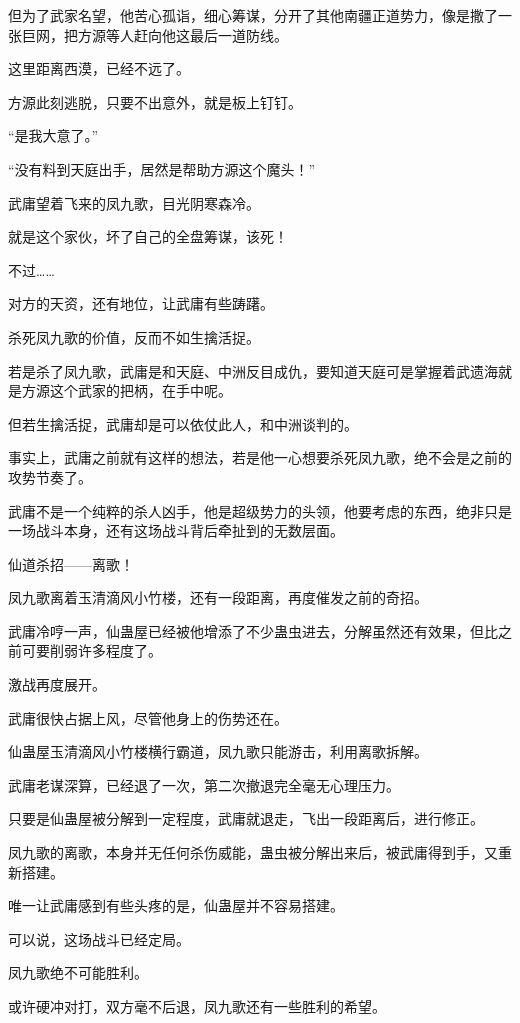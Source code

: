 \begin{this_body}
但为了武家名望，他苦心孤诣，细心筹谋，分开了其他南疆正道势力，像是撒了一张巨网，把方源等人赶向他这最后一道防线。

这里距离西漠，已经不远了。

方源此刻逃脱，只要不出意外，就是板上钉钉。

“是我大意了。”

“没有料到天庭出手，居然是帮助方源这个魔头！”

武庸望着飞来的凤九歌，目光阴寒森冷。

就是这个家伙，坏了自己的全盘筹谋，该死！

不过……

对方的天资，还有地位，让武庸有些踌躇。

杀死凤九歌的价值，反而不如生擒活捉。

若是杀了凤九歌，武庸是和天庭、中洲反目成仇，要知道天庭可是掌握着武遗海就是方源这个武家的把柄，在手中呢。

但若生擒活捉，武庸却是可以依仗此人，和中洲谈判的。

事实上，武庸之前就有这样的想法，若是他一心想要杀死凤九歌，绝不会是之前的攻势节奏了。

武庸不是一个纯粹的杀人凶手，他是超级势力的头领，他要考虑的东西，绝非只是一场战斗本身，还有这场战斗背后牵扯到的无数层面。

仙道杀招——离歌！

凤九歌离着玉清滴风小竹楼，还有一段距离，再度催发之前的奇招。

武庸冷哼一声，仙蛊屋已经被他增添了不少蛊虫进去，分解虽然还有效果，但比之前可要削弱许多程度了。

激战再度展开。

武庸很快占据上风，尽管他身上的伤势还在。

仙蛊屋玉清滴风小竹楼横行霸道，凤九歌只能游击，利用离歌拆解。

武庸老谋深算，已经退了一次，第二次撤退完全毫无心理压力。

只要是仙蛊屋被分解到一定程度，武庸就退走，飞出一段距离后，进行修正。

凤九歌的离歌，本身并无任何杀伤威能，蛊虫被分解出来后，被武庸得到手，又重新搭建。

唯一让武庸感到有些头疼的是，仙蛊屋并不容易搭建。

可以说，这场战斗已经定局。

凤九歌绝不可能胜利。

或许硬冲对打，双方毫不后退，凤九歌还有一些胜利的希望。


\end{this_body}
